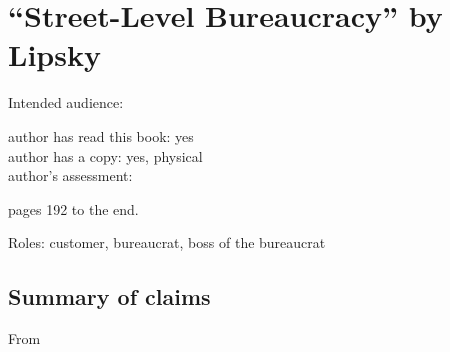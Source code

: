 \section{``Street-Level Bureaucracy'' by Lipsky\label{review:lipsky_street}}

\cite{1983_Lipsky}

Intended audience:

author has read this book: yes\\
author has a copy: yes, physical\\
author's assessment:


pages 192 to the end.

Roles: customer, bureaucrat, boss of the bureaucrat

\subsection{Summary of claims}
From \cite{2015_Cooper}
